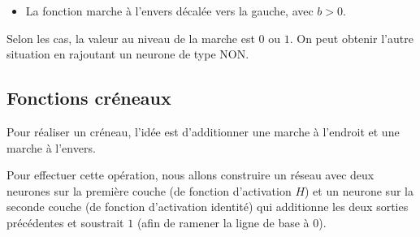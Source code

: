 \begin{itemize}
	
	\item La fonction marche à l'envers décalée vers la gauche, avec $b>0$.  
	
	\begin{center}
		\begin{minipage}{0.35\textwidth}
		\end{minipage}
		\begin{minipage}{0.59\textwidth}
		\end{minipage}
	\end{center}   
\end{itemize}

Selon les cas, la valeur au niveau de la marche est $0$ ou $1$. On peut obtenir l'autre situation en rajoutant un neurone de type \og{}NON\fg{}.

\begin{center}
	\begin{minipage}{0.35\textwidth}
	\end{minipage}
	\begin{minipage}{0.59\textwidth}
	\end{minipage}
\end{center}  



\subsection{Fonctions créneaux}

Pour réaliser un \og{}créneau\fg{}, l'idée est d'additionner une marche à l'endroit et une marche à l'envers.


Pour effectuer cette opération, nous allons construire un réseau avec deux neurones sur la première couche (de fonction d'activation $H$) et un neurone sur la seconde couche (de fonction d'activation identité) qui additionne les deux sorties précédentes et soustrait $1$ (afin de ramener la ligne de base à $0$).

\begin{center}
	\begin{minipage}{0.55\textwidth}
	\end{minipage}
	\begin{minipage}{0.35\textwidth}
	\end{minipage}
\end{center}  


